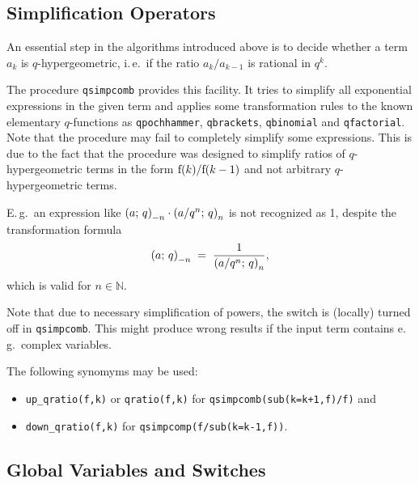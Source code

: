 
\subsection{Simplification Operators}
\label{qsum:simplification}

An essential step in the algorithms introduced above is to decide
whether a term $a_k$ is $q$-hypergeometric, i.\,e.\ if the
ratio $a_{k}/a_{k-1}$ is rational in $q^k$.

The procedure \texttt{qsimpcomb} provides this facility. It tries to
simplify all exponential expressions in the given term and applies
some transformation rules to the known elementary $q$-functions
as \texttt{qpochhammer}, \texttt{qbrackets}, \texttt{qbinomial}
and \texttt{qfactorial}. Note that the procedure may fail to
completely simplify some expressions. This is due to the fact that the
procedure was designed to simplify ratios of $q$-hypergeometric
terms in the form ${\mathrm f}(k)/{\mathrm f}(k-1)$ and not arbitrary
$q$-hypergeometric terms.

E.\,g.\ an expression like
$\left(a;\,q\right)_{-n}\cdot\left(a/q^n;\,q\right)_{n}$
is not recognized as 1, despite the transformation formula
\[ \left(a;\,q\right)_{-n} \;=\; \frac{1}{\left(a/q^n;\,q\right)_{n}},\]
which is valid for $n\in\mathbb{N}$.

Note that due to necessary simplification of powers, the switch
 is (locally) turned off in \texttt{qsimpcomb}. This
might produce wrong results if the input term contains
e.\,g.\ complex variables.

The following synomyms may be used:
\begin{itemize}
	\item \texttt{up\_qratio(f,k)} or \texttt{qratio(f,k)} for
		\texttt{qsimpcomb(sub(k=k+1,f)/f)} and
	\item \texttt{down\_qratio(f,k)} for \texttt{qsimpcomp(f/sub(k=k-1,f))}.
\end{itemize}


\subsection{Global Variables and Switches}
\label{switches}

